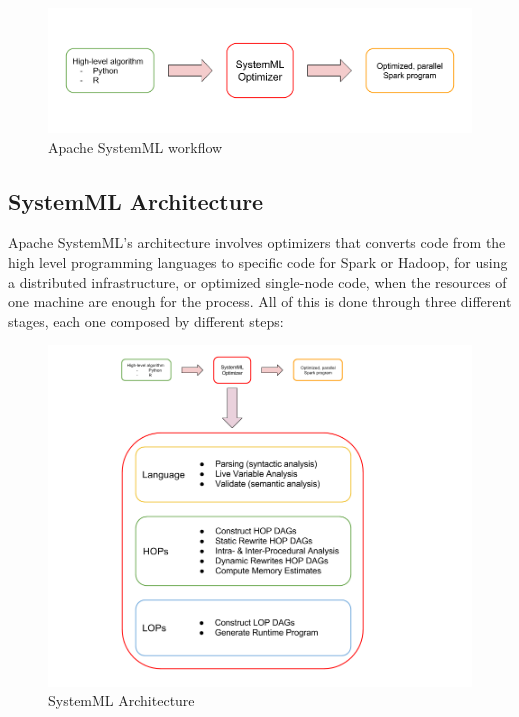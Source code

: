 \documentclass[11pt]{book} %
\begin{document}
    \begin{figure}[!ht]
      \centering
      \includegraphics[width=\textwidth]{systemml_objective.png}
      \caption{Apache SystemML workflow}
      \label{img:systemml_workflow}
    \end{figure}

    \subsection{SystemML Architecture}

      Apache SystemML's architecture involves optimizers that converts code from the high level programming languages to specific code for Spark or Hadoop, for using a distributed infrastructure, or optimized single-node code, when the resources of one machine are enough for the process. All of this is done through three different stages, each one composed by different steps:

      \begin{figure}[!ht]
        \centering
        \includegraphics[width=\textwidth]{systemml_structure.png}
        \caption{SystemML Architecture}
        \label{img:systemml_architecture}
      \end{figure}
\end{document}
